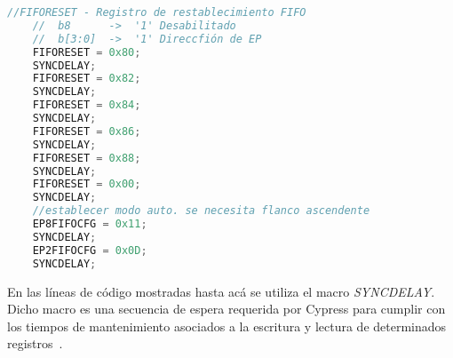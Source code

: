 	\begin{lstlisting}[language=C,backgroundcolor=\color{gray!30}]
	//FIFORESET - Registro de restablecimiento FIFO
	//	b8		->	'1' Desabilitado
	//	b[3:0]	->	'1' Direccfión de EP
	FIFORESET = 0x80;
	SYNCDELAY;
	FIFORESET = 0x82;
	SYNCDELAY;
	FIFORESET = 0x84;
	SYNCDELAY;
	FIFORESET = 0x86;
	SYNCDELAY;
	FIFORESET = 0x88;
	SYNCDELAY;
	FIFORESET = 0x00;
	SYNCDELAY;
	//establecer modo auto. se necesita flanco ascendente
	EP8FIFOCFG = 0x11;
	SYNCDELAY;
	EP2FIFOCFG = 0x0D;
	SYNCDELAY;
	\end{lstlisting}
	

	En las líneas de código mostradas hasta acá se utiliza el macro {\it SYNCDELAY}. Dicho macro es una secuencia de espera requerida por Cypress para cumplir con los tiempos de mantenimiento asociados a la escritura y lectura de determinados registros~\cite{CypressSemiconductor2014fx2lp}.%
